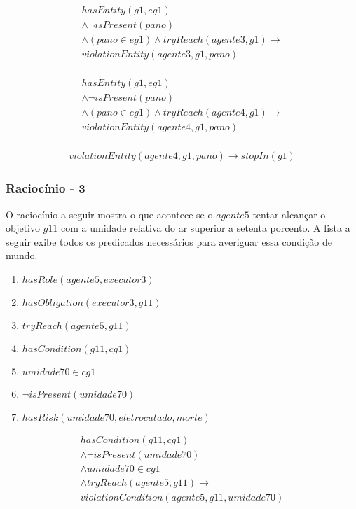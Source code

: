 \begin{eqnarray}\nonumber
	hasEntity(g1,eg1) \nonumber \\ 
	\wedge \neg isPresent(pano) 	\nonumber \\ 
	\wedge (pano \in eg1) \wedge tryReach(agente3,g1) \to \nonumber \\ 
	violationEntity(agente3,g1,pano) \nonumber \\
\end{eqnarray}

\begin{eqnarray}\nonumber
	hasEntity(g1,eg1) \nonumber \\ 
	\wedge \neg isPresent(pano) 	\nonumber \\ 
	\wedge (pano \in eg1) \wedge tryReach(agente4,g1) \to \nonumber \\ 
	violationEntity(agente4,g1,pano) \nonumber \\
\end{eqnarray}

\begin{eqnarray}
	violationEntity(agente4,g1,pano) \to stopIn(g1)
\end{eqnarray}



\subsubsection{Raciocínio - 3} 

O raciocínio a seguir mostra o que acontece se o $agente5$ tentar alcançar o objetivo $g11$ com a umidade relativa do ar superior a setenta porcento. A lista a seguir exibe todos os predicados necessários para averiguar essa condição de mundo. 

\begin{enumerate}
	\item $hasRole(agente5,executor3)$
	\item $hasObligation(executor3,g11)$	
	\item $tryReach(agente5,g11)$ 
	\item $hasCondition(g11,cg1)$
	\item $umidade70 \in cg1$	
	\item $\neg isPresent(umidade70)$
	\item $hasRisk(umidade70,eletrocutado,morte)$
\end{enumerate}

\begin{eqnarray}
	hasCondition(g11,cg1) \nonumber \\ 
	\wedge \neg isPresent(umidade70) \nonumber \\
	\wedge umidade70 \in cg1 \nonumber \\
	\wedge tryReach(agente5,g11) \to \nonumber \\  
	violationCondition(agente5,g11,umidade70) \nonumber \\
\end{eqnarray}

